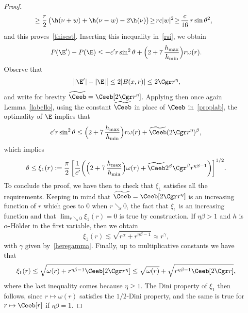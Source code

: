 \begin{proof}
\[\begin{split}
&\geq \frac r2\, \big(\h(\nu+w)+\h(\nu-w) -2\h(\nu)\big)
\!\geq\! r c |w|^2\!\geq\! \frac c{16}\, r \sin\theta^2,
\end{split}\]
and this proves~\eqref{thisest}. Inserting this inequality in~\eqref{rsi}, we obtain
\[
P(\E')-P(\E) \leq -c'r \sin^2 \theta +\Bigl(2 +7\,\frac{h_{\max}}{h_{\min}}\Bigr)r \omega(r).
\]
Observe that
\[
\big||\E'|-|\E|\big|\leq 2|B(x,r)| \leq 2\Cgr r^\eta,
\]
and write for brevity $\widetilde\Ceeb = \Ceeb [ 2\Cgr r^\eta]$. Applying then once again Lemma~\ref{labello}, using the constant $\widetilde\Ceeb$ in place of $\Ceeb$ in~\eqref{proplab}, the optimality of $\E$ implies that
\[
c' r \sin^2 \theta \leq \Bigl(2 +7\,\frac{h_{\max}}{h_{\min}}\Bigr)r \omega(r) + \widetilde\Ceeb (2\Cgr r^\eta)^\beta ,
\]
which implies
\[
\theta\leq\xi_1(r):= \frac \pi 2\, \bigg[\frac 1{c'}\bigg(\Bigl(2 +7\,\frac{h_{\max}}{h_{\min}}\Bigr) \omega(r) + \widetilde\Ceeb 2^\beta\Cgr^\beta r^{\eta\beta-1} \bigg)\bigg]^{1/2}.
\]
To conclude the proof, we have then to check that $\xi_1$ satisfies all the requirements. Keeping in mind that $\widetilde\Ceeb=\Ceeb[2\Cgr r^\eta]$ is an increasing function of $r$ which goes to $0$ when $r\searrow 0$, the fact that $\xi_1$ is an increasing function and that $\lim_{r\searrow 0} \xi_1(r)=0$ is true by construction. If $\eta\beta>1$ and $h$ is $\alpha$-H\"older in the first variable, then we obtain
\[
\xi_1(r) \lesssim \sqrt{r^\alpha + r^{\eta\beta-1}}\approx r^\gamma,
\]
with $\gamma$ given by~\eqref{heregamma}. Finally, up to multiplicative constants we have that
\[
\xi_1(r) \leq \sqrt{\omega(r) + r^{\eta\beta-1}\Ceeb[2\Cgr r^\eta]}
\leq \sqrt{\omega(r)} + \sqrt{r^{\eta\beta-1}\Ceeb[2\Cgr r]},
\]
where the last inequality comes because $\eta\geq 1$. The Dini property of $\xi_1$ then follows, since $r\mapsto \omega(r)$ satisfies the $1/2$-Dini property, and the same is true for $r\mapsto\Ceeb[r]$ if $\eta\beta=1$.
\end{proof}

